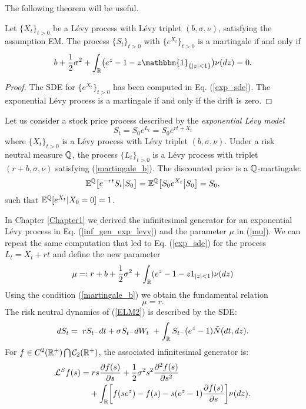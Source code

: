 The following theorem will be useful.
\begin{Theorem}
 Let $\{X_t\}_{t>0}$ be a Lévy process with Lévy triplet $(b,\sigma,\nu)$, satisfying the assumption EM. The process $\{S_t\}_{t>0}$ with $\{e^{X_t}\}_{t>0}$ is a martingale if and only if
 \begin{equation}\label{martingale_b}
  b +\frac{1}{2} \sigma^2  + \int_{\R} \bigl( e^z-1 -z\mathbbm{1}_{\{ |z|<1 \}} \bigr) \nu(dz) = 0.
 \end{equation}
\end{Theorem}
\begin{proof}
 The SDE for $\{e^{X_t}\}_{t>0}$ has been computed in Eq. (\ref{exp_sde}). The exponential Lévy process is a martingale if and only if the drift is zero.
\end{proof}
Let us consider a stock price process described by the \emph{exponential Lévy model}
\begin{equation}\label{ELM2}
 S_t = S_0 e^{L_t} = S_0 e^{rt + X_t}
\end{equation}
where $\{X_t\}_{t>0}$ is a Lévy process with Lévy triplet $(b,\sigma,\nu)$. Under a risk neutral measure $\mathbb{Q}$, the process $\{L_t\}_{t>0}$ 
is a Lévy process with triplet $(r+b,\sigma,\nu)$ 
satisfying (\ref{martingale_b}).  
The discounted price is a $\mathbb{Q}$-martingale:
\begin{equation}
 \mathbb{E}^{\mathbb{Q}} \bigl[ e^{-rt} S_t \bigr| S_0 \bigr] =  \mathbb{E}^{\mathbb{Q}} \bigl[ S_0e^{X_t} \bigr| S_0 \bigr] = S_0, 
\end{equation}
such that $\mathbb{E}^{\mathbb{Q}}[ e^{X_t} | X_0=0] = 1 $. 

In Chapter \ref{Chapter1} we derived the infinitesimal generator for an exponential Lévy process in Eq. (\ref{inf_gen_exp_levy}) and the 
parameter $\mu$ in (\ref{mu}).
We can repeat the same computation that led to Eq. (\ref{exp_sde}) for the process $L_t = X_t + rt$ and define the new parameter
\begin{equation}\label{mu2}
 \mu =: r + b + \frac{1}{2}\sigma^2 + \int_{\mathbb{R}} ( e^{z} - 1 -z1_{|z|<1}) \nu(dz)
\end{equation}
Using the condition (\ref{martingale_b}) we obtain the fundamental relation
\begin{equation}\label{mu=r}
 \mu = r.
\end{equation}
The risk neutral dynamics of (\ref{ELM2}) is described by the SDE:
\begin{equation}\label{RN_sde}
 d S_t = \; r S_{t^-} dt +  \sigma S_{t^-} dW_t \; + \int_{\mathbb{R}} S_{t^-} (e^{z} - 1) \tilde N(dt,dz). 
\end{equation}
For $f \in C^{2}(\mathbb{R}^+) \bigcap \mathcal{C}_2(\mathbb{R}^+)$, the associated infinitesimal generator is:
\begin{align}\label{RN_inf_gen}
 \mathcal{L}^S f(s) =& \; r s \frac{\partial f(s)}{\partial s}
+ \frac{1}{2} \sigma^2 s^2 \frac{\partial^2  f(s)}{\partial s^2}  \\ \nonumber
&+ \int_{\mathbb{R}} \biggl[ f(se^z) - f(s) - s(e^z-1)\frac{\partial f(s)}{\partial s} \biggr] \nu(dz).
\end{align}

